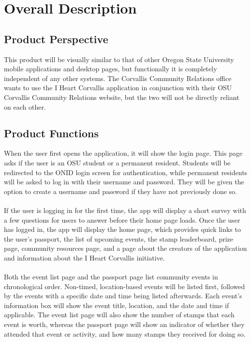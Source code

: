 \documentclass[draftclsnofoot, onecolumn, 10pt, compsoc]{IEEEtran}
\begin{document}
	\section{Overall Description}
		\subsection{Product Perspective}
			This product will be visually similar to that of other Oregon State University mobile applications and desktop pages, but functionally it is completely independent of any other systems. The Corvallis Community Relations office wants to use the I Heart Corvallis application in conjunction with their OSU Corvallis Community Relations website, but the two will not be directly reliant on each other.
		
		\subsection{Product Functions}
			When the user first opens the application, it will show the login page. This page asks if the user is an OSU student or a permanent resident. Students will be redirected to the ONID login screen for authentication, while permanent residents will be asked to log in with their username and password. They will be given the option to create a username and password if they have not previously done so. \\ \\
			If the user is logging in for the first time, the app will display a short survey with a few questions for users to answer before their home page loads. Once the user has logged in, the app will display the home page, which provides quick links to the user's passport, the list of upcoming events, the stamp leaderboard, prize page, community resources page, and a page about the creators of the application and information about the I Heart Corvallis initiative. \\ \\
			Both the event list page and the passport page list community events in chronological order. Non-timed, location-based events will be listed first, followed by the events with a specific date and time being listed afterwards. Each event's information box will show the event title, location, and the date and time if applicable. The event list page will also show the number of stamps that each event is worth, whereas the passport page will show an indicator of whether they attended that event or activity, and how many stamps they received for doing so. \\ \\
\end{document}
